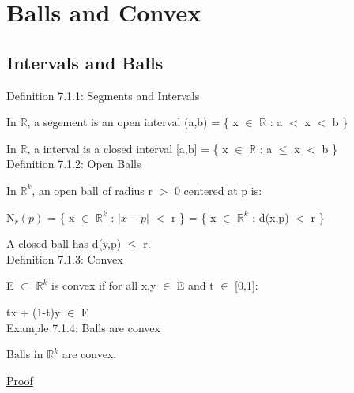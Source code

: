 \newpage

\section[Day 7: Balls and Convex]{ Balls and Convex }

\subsection{ Intervals and Balls } 

{ \color{blue} Definition 7.1.1: Segments and Intervals } 

	\begin{adjustbox}{minipage=14cm, right, vspace=0.1cm 0cm}
		In $\mathbb{R}$, a segement is an open interval (a,b) = \{ x $\in$ $\mathbb{R}$ : a $<$ x $<$ b \}

		In $\mathbb{R}$, a interval is a closed interval [a,b] = \{ x $\in$ $\mathbb{R}$ : a $\leq$ x $<$ b \} \\
	\end{adjustbox}

{ \color{blue} Definition 7.1.2: Open Balls } 

	\begin{adjustbox}{minipage=14cm, right, vspace=0.1cm 0cm}
		In $\mathbb{R}^k$, an open ball of radius r $>$ 0 centered at p is:

		\qquad N$_r(p)$ = \{ x $\in$ $\mathbb{R}^k$ : $|x-p|$ $<$ r \}
		= \{ x $\in$ $\mathbb{R}^k$ : d(x,p) $<$ r \}

		A closed ball has d(y,p) $\leq$ r. \\
	\end{adjustbox}

{ \color{blue} Definition 7.1.3: Convex } 

	\begin{adjustbox}{minipage=14cm, right, vspace=0.1cm 0cm}
		E $\subset$ $\mathbb{R}^k$ is convex if for all
		x,y $\in$ E and t $\in$ [0,1]:

		\qquad tx + (1-t)y $\in$ E \\
	\end{adjustbox}

{ \color{purple} Example 7.1.4: Balls are convex }

	\begin{adjustbox}{minipage=14cm, right, vspace=0.1cm 0cm}
		Balls in $\mathbb{R}^k$ are convex.
	\end{adjustbox}

{ \color{magenta} \underline{Proof} }


